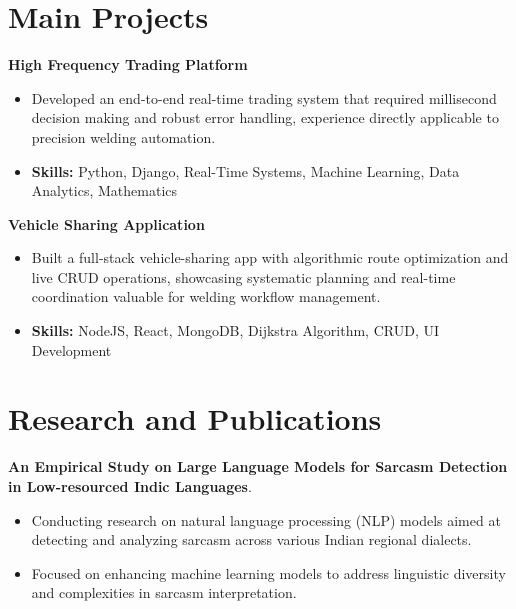 \documentclass[a4paper,11pt]{article}
\begin{document}
\section{\textbf{Main Projects}}

\vspace{1mm}
  \textbf{High Frequency Trading Platform  }
\vspace{-1.5mm} %
\begin{itemize}
  \item Developed an end-to-end real-time trading system that required millisecond decision making and robust error handling, experience directly applicable to precision welding automation.
\vspace{-3mm}
  \item \textbf{Skills:} Python, Django, Real-Time Systems, Machine Learning, Data Analytics, Mathematics
\end{itemize}


\vspace{1mm}
   \textbf{Vehicle Sharing Application }
\vspace{-1.5mm} %
\begin{itemize}
  \item Built a full-stack vehicle-sharing app with algorithmic route optimization and live CRUD operations, showcasing systematic planning and real-time coordination valuable for welding workflow management.
\vspace{-3mm}
  \item \textbf{Skills:} NodeJS, React, MongoDB, Dijkstra Algorithm, CRUD, UI Development
\end{itemize}



\section{\textbf{Research and Publications} \hfill }
\vspace{1mm}
  \textbf{An Empirical Study on Large Language Models for Sarcasm Detection in Low-resourced Indic Languages}.
\vspace{-1mm} %
\begin{itemize}
  \item Conducting research on natural language processing (NLP) models aimed at detecting and analyzing sarcasm across various Indian regional dialects.
\vspace{-3mm}
  \item Focused on enhancing machine learning models to address linguistic diversity and complexities in sarcasm interpretation.
\end{itemize}
\end{document}
